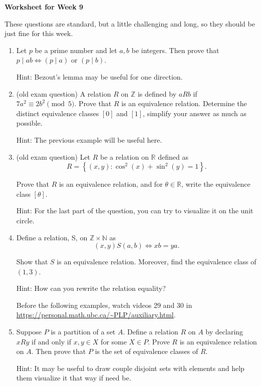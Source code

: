 \documentclass[12pt]{article}
\newcommand{\set}[1]{\left\{ #1 \right\}}
\begin{document}
\centerline{\bf\large Worksheet for Week 9}

\vspace{25pt}

These questions are standard, but a little challenging and long, so they should be just fine for this week.

\begin{enumerate}

\item Let $p$ be a prime number and let $a,b$ be integers. Then prove that $p\mid ab \iff (p\mid a) \text{ or } (p\mid b)$.

Hint: Bezout's lemma may be useful for one direction.

\item (old exam question) A relation $R$ on $\mathbb Z$ is defined by $aRb$ if $7a^2\equiv 2b^2 \pmod 5$. Prove that $R$ is an equivalence relation. Determine the distinct equivalence classes $[0]$ and $[1]$, simplify your answer as much as possible.\

Hint: The previous example will be useful here.



\item (old exam question)  Let $R$ be a relation on $\mathbb R$ defined as
\[ R=\set{(x,y): \cos^2(x)+\sin^2(y)=1}. \]

Prove that $R$ is an equivalence relation, and for $\theta\in\mathbb R$, write the equivalence class $[\theta]$.

Hint: For the last part of the question, you can try to visualize it on the unit circle.


\item Define a relation, S, on $\mathbb Z\times \mathbb N$ as
\[(x,y) S (a,b)\Leftrightarrow xb=ya.\]

Show that $S$  is an equivalence relation. Moreover, find the equivalence class of $(1,3)$.

Hint: How can you rewrite the relation equality?

Before the following examples, watch videos 29 and 30 in \url{https://personal.math.ubc.ca/~PLP/auxiliary.html}.

\item Suppose $P$ is a partition of a set $A$. Define a relation $R$ on $A$ by declaring $x R y$
if and only if $x, y \in X$ for some $X \in P$. Prove $R$ is an equivalence relation on $A$.
Then prove that $P$ is the set of equivalence classes of $R$.

Hint: It may be useful to draw couple disjoint sets with elements and help them visualize it that way if need be.



\end{enumerate}
\end{document}
